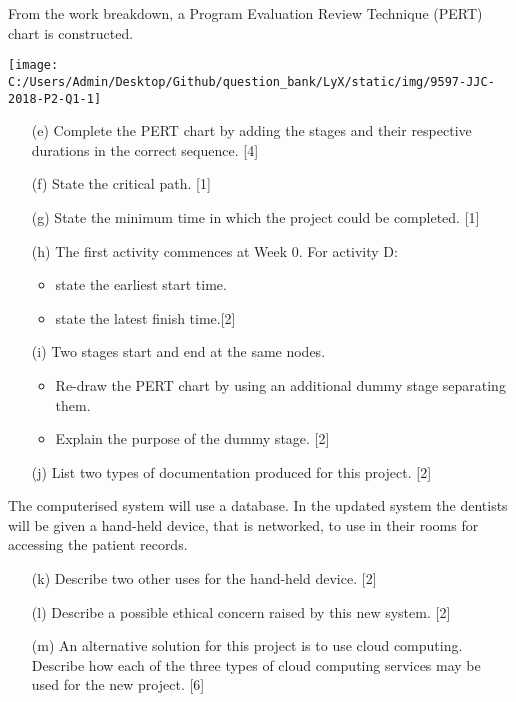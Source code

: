 From the work breakdown, a Program Evaluation Review Technique (PERT)
chart is constructed. 
\begin{center}
\texttt{[image: C:/Users/Admin/Desktop/Github/question\_bank/LyX/static/img/9597-JJC-2018-P2-Q1-1]}
\par\end{center}
\begin{enumerate}
\item[(e)]  Complete the PERT chart by adding the stages and their respective
durations in the correct sequence.\hfill{} {[}4{]}
\item[(f)]  State the critical path.\hfill{} {[}1{]}
\item[(g)]  State the minimum time in which the project could be completed.\hfill{}
{[}1{]}
\item[(h)]  The first activity commences at Week 0. For activity D: 
\begin{itemize}
\item state the earliest start time. 
\item state the latest finish time.\hfill{}{[}2{]}
\end{itemize}
\item[(i)]  Two stages start and end at the same nodes. 
\begin{itemize}
\item Re-draw the PERT chart by using an additional dummy stage separating
them. 
\item Explain the purpose of the dummy stage. \hfill{} {[}2{]}
\end{itemize}
\item[(j)]  List two types of documentation produced for this project. \hfill{}{[}2{]}
\end{enumerate}
The computerised system will use a database. In the updated system
the dentists will be given a hand-held device, that is networked,
to use in their rooms for accessing the patient records. 
\begin{enumerate}
\item[(k)]  Describe two other uses for the hand-held device. \hfill{} {[}2{]}
\item[(l)]  Describe a possible ethical concern raised by this new system. \hfill{}{[}2{]}
\item[(m)] An alternative solution for this project is to use cloud computing.
Describe how each of the three types of cloud computing services may
be used for the new project. \hfill{} {[}6{]}
\end{enumerate}